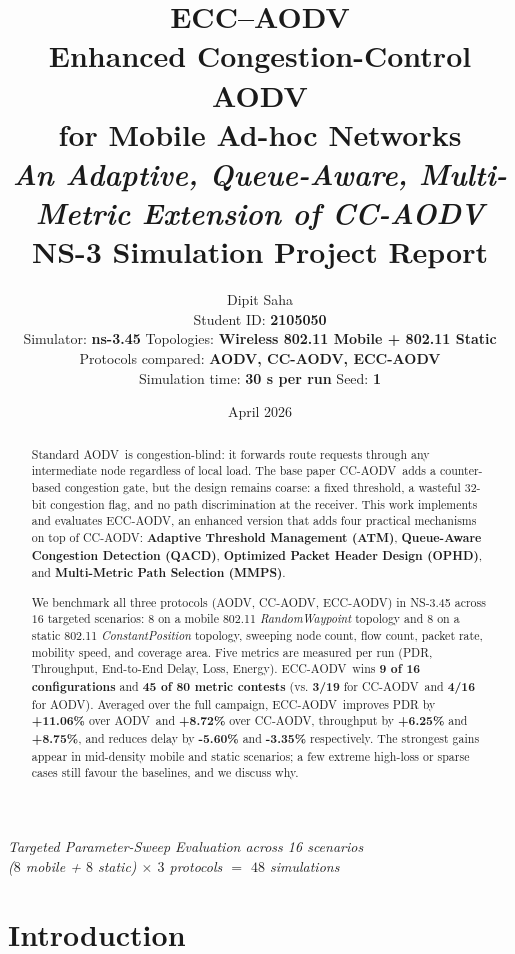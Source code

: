 \documentclass[11pt,a4paper]{article}
\title{
    \vspace{1cm}
    \Huge\textbf{ECC--AODV} \\[0.3cm]
    \LARGE Enhanced Congestion-Control AODV \\
    for Mobile Ad-hoc Networks \\[0.6cm]
    \large \textit{An Adaptive, Queue-Aware, Multi-Metric Extension of CC-AODV} \\[0.6cm]
    \large NS-3 Simulation Project Report
}
\author{
    \large Dipit Saha \\[0.2cm]
    \normalsize Student ID: \textbf{2105050} \\[0.6cm]
    \normalsize Simulator: \textbf{ns-3.45} \quad
    Topologies: \textbf{Wireless 802.11 Mobile + 802.11 Static} \\[0.2cm]
    \normalsize Protocols compared: \textbf{AODV, CC-AODV, ECC-AODV} \\[0.2cm]
    \normalsize Simulation time: \textbf{30 s per run} \quad Seed: \textbf{1}
}
\date{April 2026}
\newcommand{\ecc}{ECC-AODV}
\newcommand{\cca}{CC-AODV}
\newcommand{\aodv}{AODV}
\begin{document}
\maketitle
\thispagestyle{empty}
\vfill
\begin{center}
\textit{Targeted Parameter-Sweep Evaluation across 16 scenarios \\
($8$ mobile + $8$ static) $\times$ $3$ protocols $=$ $48$ simulations}
\end{center}
\newpage

\begin{abstract}
Standard \aodv\ is congestion-blind: it forwards route requests through any
intermediate node regardless of local load. The base paper \cca\ adds a
counter-based congestion gate, but the design remains coarse: a fixed
threshold, a wasteful 32-bit congestion flag, and no path discrimination at
the receiver. This work implements and evaluates \ecc, an enhanced version
that adds four practical mechanisms on top of \cca: \textbf{Adaptive Threshold
Management (ATM)}, \textbf{Queue-Aware Congestion Detection (QACD)},
\textbf{Optimized Packet Header Design (OPHD)}, and \textbf{Multi-Metric
Path Selection (MMPS)}.

We benchmark all three protocols (\aodv, \cca, \ecc) in NS-3.45 across $16$
targeted scenarios: $8$ on a mobile 802.11 \textit{RandomWaypoint} topology and
$8$ on a static 802.11 \textit{ConstantPosition} topology, sweeping node count,
flow count, packet rate, mobility speed, and coverage area. Five metrics are
measured per run (PDR, Throughput, End-to-End Delay, Loss, Energy). \ecc\ wins
\textbf{9 of 16 configurations} and \textbf{45 of 80 metric contests} (vs.
\textbf{3/19} for \cca\ and \textbf{4/16} for \aodv). Averaged over the full campaign,
\ecc\ improves PDR by \textbf{+11.06\%} over \aodv\ and \textbf{+8.72\%}
over \cca, throughput by \textbf{+6.25\%} and \textbf{+8.75\%}, and reduces
delay by \textbf{-5.60\%} and \textbf{-3.35\%} respectively. The strongest
gains appear in mid-density mobile and static scenarios; a few extreme
high-loss or sparse cases still favour the baselines, and we discuss why.
\end{abstract}

\tableofcontents
\newpage

\section{Introduction}
\end{document}
